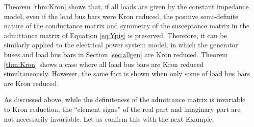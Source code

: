 \documentclass[graybox, envcountchap]{svmult}
\begin{document}
Theorem \ref{thm:Kron} shows that, if all loads are given by the constant impedance model, even if the load bus bars were Kron reduced, 
the positive semi-definite nature of the conductance matrix and symmetry of the susceptance matrix in the admittance matrix of Equation \ref{eq:Ypig} is preserved.
Therefore, it can be similarly applied to the electrical power system model, in which the generator buses and load bus bars in Section \ref{sec:allgen} are Kron reduced.
Theorem \ref{thm:Kron} shows a case where all load bus bars are Kron reduced simultaneously. However, the same fact is shown when only some of load bus bars are Kron reduced.

As discussed above, while the definiteness of the admittance matrix is invariable to Kron reduction, the “element signs” of the real part and imaginary part are not necessarily invariable. 
Let us confirm this with the next Example.
\
\end{document}
